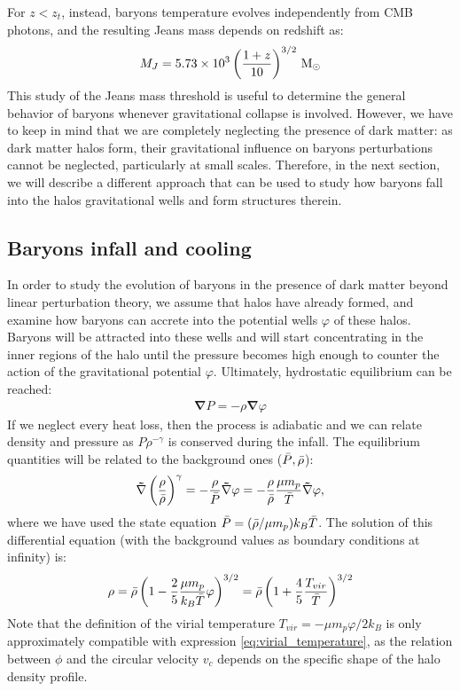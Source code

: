  For $z<z_t$, instead, baryons temperature evolves independently from CMB photons, and the resulting Jeans mass depends on redshift as: 
 \begin{align}
   M_J = 5.73\times 10^3 \left(\frac{1+z}{10}\right)^{3/2} \,{\rm M}_{\odot} \label{eq:jeans_threshold}
 \end{align}
 This study of the Jeans mass threshold is useful to determine the general behavior of baryons whenever gravitational collapse is involved. However, we have to keep in mind that we are completely neglecting the presence of dark matter: as dark matter halos form, their gravitational influence on baryons perturbations cannot be neglected, particularly at small scales. Therefore, in the next section, we will describe a different approach that can be used to study how baryons fall into the halos gravitational wells and form structures therein.
 

 \subsection{Baryons infall and cooling} \label{sec:infall_and_cooling}
  
  In order to study the evolution of baryons in the presence of dark matter beyond linear perturbation theory, we assume that halos have already formed, and examine how baryons can accrete into the potential wells $\varphi$ of these halos. Baryons will be attracted into these wells and will start concentrating in the inner regions of the halo until the pressure becomes high enough to counter the action of the gravitational potential $\varphi$. Ultimately, hydrostatic equilibrium can be reached:
  \begin{align}
   \mathbf{\nabla} P = -\rho \mathbf{\nabla} \varphi   
 \end{align}
  If we neglect every heat loss, then the process is adiabatic and we can relate density and pressure as $P\rho^{-\gamma}$ is conserved during the infall. The equilibrium quantities will be related to the background ones ($\Bar{P}, \Bar{\rho}$): 
  \begin{align}
   \mathbf{\nabla} \left(\frac{\rho}{\Bar{\rho}}\right)^\gamma = -\frac{\rho}{\Bar{P}} \mathbf{\nabla} \varphi = -\frac{\rho}{\Bar{\rho}} \frac{\mu m_p}{\Bar{T}} \mathbf{\nabla} \varphi,  
 \end{align}
 where we have used the state equation $\Bar{P}= (\Bar{\rho}/\mu m_p) k_B \Bar{T}$. The solution of this differential equation (with the background values as boundary conditions at infinity) is:
 \begin{align}
   \rho = \Bar{\rho} \left(1-\frac{2}{5}\frac{\mu m_p}{k_B \Bar{T}}\varphi\right)^{3/2} = \Bar{\rho} \left(1+\frac{4}{5}\frac{T_{vir}}{\Bar{T}}\right)^{3/2} \label{eq:baryon_accretion}
 \end{align}
 Note that the definition of the virial temperature $T_{vir}=-\mu m_p \varphi / 2 k_B$ is only approximately compatible with expression \ref{eq:virial_temperature}, as the relation between $\phi$ and the circular velocity $v_c$ depends on the specific shape of the halo density profile.
 
